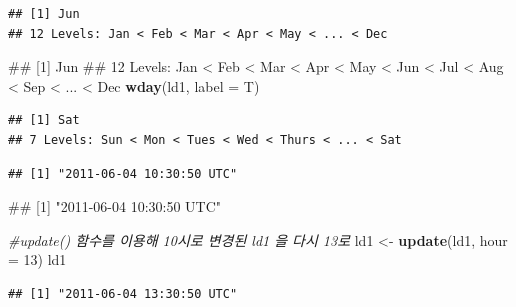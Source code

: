 \documentclass[10pt,]{krantz}
\makeatletter
\newenvironment{Shaded}{\begin{snugshade}}{\end{snugshade}}
\newcommand{\KeywordTok}[1]{\textcolor[rgb]{0.13,0.29,0.53}{\textbf{#1}}}
\newcommand{\DataTypeTok}[1]{\textcolor[rgb]{0.13,0.29,0.53}{#1}}
\newcommand{\DecValTok}[1]{\textcolor[rgb]{0.00,0.00,0.81}{#1}}
\newcommand{\StringTok}[1]{\textcolor[rgb]{0.31,0.60,0.02}{#1}}
\newcommand{\CommentTok}[1]{\textcolor[rgb]{0.56,0.35,0.01}{\textit{#1}}}
\newcommand{\OperatorTok}[1]{\textcolor[rgb]{0.81,0.36,0.00}{\textbf{#1}}}
\newcommand{\NormalTok}[1]{#1}
\newenvironment{kframe}{%
\medskip{}
\setlength{\fboxsep}{.8em}
 \def\at@end@of@kframe{}%
 \ifinner\ifhmode%
  \def\at@end@of@kframe{\end{minipage}}%
  \begin{minipage}{\columnwidth}%
 \fi\fi%
 \def\FrameCommand##1{\hskip\@totalleftmargin \hskip-\fboxsep
 \colorbox{shadecolor}{##1}\hskip-\fboxsep
     \hskip-\linewidth \hskip-\@totalleftmargin \hskip\columnwidth}%
 \MakeFramed {\advance\hsize-\width
   \@totalleftmargin\z@ \linewidth\hsize
   \@setminipage}}%
 {\par\unskip\endMakeFramed%
 \at@end@of@kframe}
\renewenvironment{Shaded}{\begin{kframe}}{\end{kframe}}
\makeatother
\begin{document}
\begin{verbatim}
## [1] Jun
## 12 Levels: Jan < Feb < Mar < Apr < May < ... < Dec
\end{verbatim}

\begin{Shaded}
\begin{Highlighting}[]
\NormalTok{## [1] Jun}
\NormalTok{## 12 Levels: Jan < Feb < Mar < Apr < May < Jun < Jul < Aug < Sep < ... < Dec}
\KeywordTok{wday}\NormalTok{(ld1, }\DataTypeTok{label =}\NormalTok{ T)}
\end{Highlighting}
\end{Shaded}

\begin{verbatim}
## [1] Sat
## 7 Levels: Sun < Mon < Tues < Wed < Thurs < ... < Sat
\end{verbatim}

\begin{Shaded}
\end{Shaded}

\begin{verbatim}
## [1] "2011-06-04 10:30:50 UTC"
\end{verbatim}

\begin{Shaded}
\begin{Highlighting}[]
\NormalTok{## [1] "2011-06-04 10:30:50 UTC"}

\CommentTok{#update() 함수를 이용해 10시로 변경된 ld1 을 다시 13로}
\NormalTok{ld1 <-}\StringTok{ }\KeywordTok{update}\NormalTok{(ld1, }\DataTypeTok{hour =} \DecValTok{13}\NormalTok{)}
\NormalTok{ld1}
\end{Highlighting}
\end{Shaded}

\begin{verbatim}
## [1] "2011-06-04 13:30:50 UTC"
\end{verbatim}

\begin{Shaded}
\end{Shaded}
\end{document}
